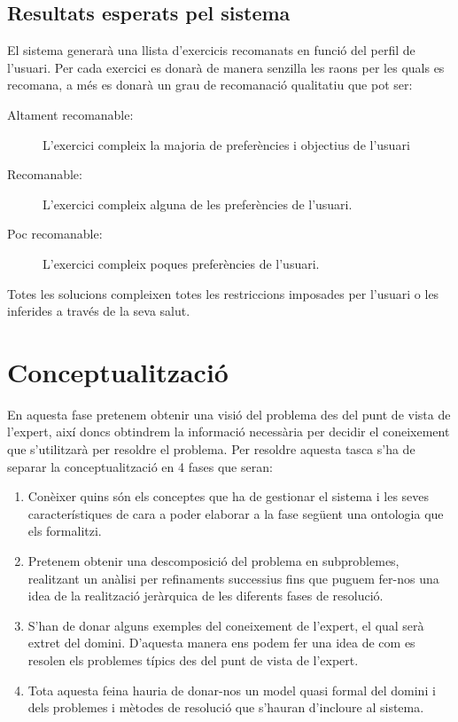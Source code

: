 \documentclass[a4paper, 12pt]{article}
\begin{document}
\subsection{Resultats esperats pel sistema}

El sistema generarà una llista d'exercicis recomanats en funció del perfil de l'usuari. Per cada exercici es donarà de manera senzilla les raons per les quals es recomana, a més es donarà un grau de recomanació qualitatiu que pot ser:

\begin{description}
	\item[Altament recomanable:] L'exercici compleix la majoria de preferències i objectius de l'usuari
	\item[Recomanable:] L'exercici compleix alguna de les preferències de l'usuari.
	\item[Poc recomanable:] L'exercici compleix poques preferències de l'usuari.
\end{description}

Totes les solucions compleixen totes les restriccions imposades per l'usuari o les inferides a través de la seva salut.

\section{Conceptualització}

En aquesta fase pretenem obtenir una visió del problema des del punt de vista de l'expert, així doncs obtindrem  la informació necessària per decidir el coneixement que s'utilitzarà per resoldre el problema. Per resoldre aquesta tasca s'ha de separar la conceptualització en 4 fases que seran:

\begin{enumerate}
	\item Conèixer quins són els conceptes que ha de gestionar el sistema i les seves característiques de cara a poder elaborar a la fase següent una ontologia que els formalitzi.
	\item Pretenem obtenir una descomposició del problema en subproblemes, realitzant un anàlisi per refinaments successius fins que puguem fer-nos una idea de la realització jeràrquica de les diferents fases de resolució.
	\item S'han de donar alguns exemples del coneixement de l'expert, el qual serà extret del domini. D'aquesta manera ens podem fer una idea de com es resolen els problemes típics des del punt de vista de l'expert.
	\item Tota aquesta feina hauria de donar-nos un model quasi formal del domini i dels problemes i mètodes de resolució que s'hauran d'incloure al sistema.
\end{enumerate}
\end{document}

